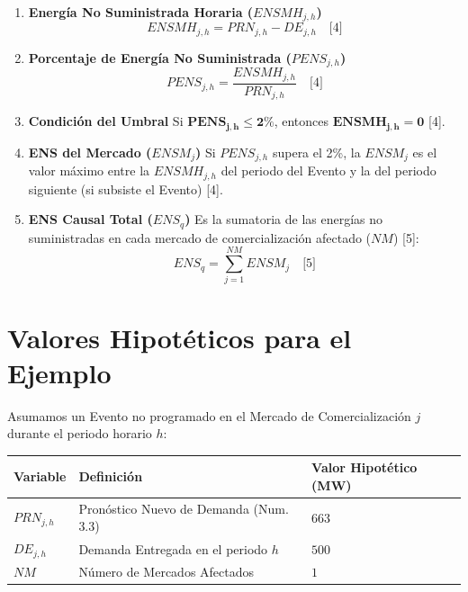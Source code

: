 \documentclass[a5paper]{book}%
\begin{document}
\begin{enumerate}
	\item \textbf{Energía No Suministrada Horaria ($ENSMH_{j,h}$)}
	\begin{equation}
		ENSMH_{j,h} = PRN_{j,h} - DE_{j,h} \quad \text{[4]}
	\end{equation}
	
	\item \textbf{Porcentaje de Energía No Suministrada ($PENS_{j,h}$)}
	\begin{equation}
		PENS_{j,h} = \frac{ENSMH_{j,h}}{PRN_{j,h}} \quad \text{[4]}
	\end{equation}
	
	\item \textbf{Condición del Umbral}
	Si $\mathbf{PENS_{j,h} \le 2\%}$, entonces $\mathbf{ENSMH_{j,h} = 0}$ [4].
	
	\item \textbf{ENS del Mercado ($ENSM_j$)}
	Si $PENS_{j,h}$ supera el 2\%, la $ENSM_j$ es el valor máximo entre la $ENSMH_{j,h}$ del periodo del Evento y la del periodo siguiente (si subsiste el Evento) [4].
	
	\item \textbf{ENS Causal Total ($ENS_q$)}
	Es la sumatoria de las energías no suministradas en cada mercado de comercialización afectado ($NM$) [5]:
	\begin{equation}
		ENS_q = \sum_{j=1}^{NM} ENSM_j \quad \text{[5]}
	\end{equation}
\end{enumerate}

\section*{Valores Hipotéticos para el Ejemplo}

Asumamos un Evento no programado en el Mercado de Comercialización $j$ durante el periodo horario $h$:

\begin{center}
	\begin{tabular}{|l|p{6cm}|p{2cm}|}
		\hline
		\textbf{Variable} & \textbf{Definición} & \textbf{Valor Hipotético (MW)} \\
		\hline
		$PRN_{j,h}$ & Pronóstico Nuevo de Demanda (Num. 3.3) & $663$ \\
		$DE_{j,h}$ & Demanda Entregada en el periodo $h$ & $500$ \\
		$NM$ & Número de Mercados Afectados & $1$ \\
		\hline
	\end{tabular}
\end{center}
\end{document}
